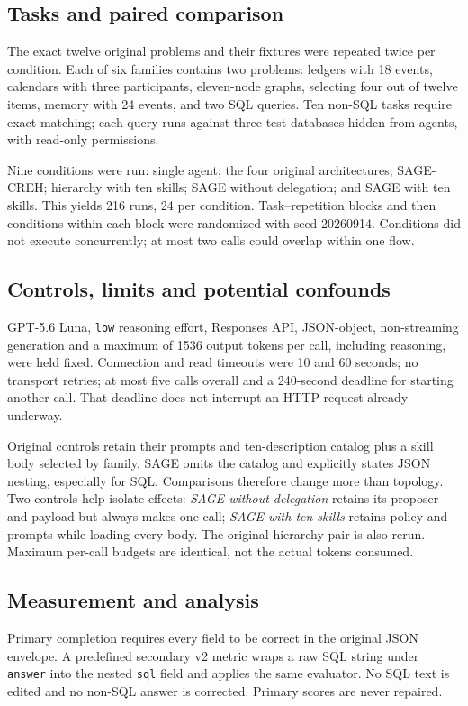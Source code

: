 \documentclass[11pt,a4paper]{article}
\begin{document}
\subsection{Tasks and paired comparison}
The exact twelve original problems and their fixtures were repeated twice per
condition. Each of six families contains two problems: ledgers with 18 events,
calendars with three participants, eleven-node graphs, selecting four out of twelve
items, memory with 24 events, and two SQL queries. Ten non-SQL tasks require exact
matching; each query runs against three test databases hidden from agents, with
read-only permissions.

Nine conditions were run: single agent; the four original architectures; SAGE-CREH;
hierarchy with ten skills; SAGE without delegation; and SAGE with ten skills.
This yields 216 runs, 24 per condition. Task--repetition blocks and then conditions
within each block were randomized with seed 20260914. Conditions did not execute
concurrently; at most two calls could overlap within one flow.

\subsection{Controls, limits and potential confounds}
GPT-5.6 Luna, \texttt{low} reasoning effort, Responses API, JSON-object, non-streaming
generation and a maximum of 1536 output tokens per call, including reasoning,
were held fixed. Connection and read timeouts were 10 and 60 seconds; no transport
retries; at most five calls overall and a 240-second deadline for starting another
call. That deadline does not interrupt an HTTP request already underway.

Original controls retain their prompts and ten-description catalog plus a skill
body selected by family. SAGE omits the catalog and explicitly states JSON nesting,
especially for SQL. Comparisons therefore change more than topology. Two controls
help isolate effects: \textit{SAGE without delegation} retains its proposer and
payload but always makes one call; \textit{SAGE with ten skills} retains policy and
prompts while loading every body. The original hierarchy pair is also rerun.
Maximum per-call budgets are identical, not the actual tokens consumed.

\subsection{Measurement and analysis}
Primary completion requires every field to be correct in the original JSON
envelope. A predefined secondary v2 metric wraps a raw SQL string under
\texttt{answer} into the nested \texttt{sql} field and applies the same evaluator.
No SQL text is edited and no non-SQL answer is corrected. Primary scores are never
repaired.
\end{document}
